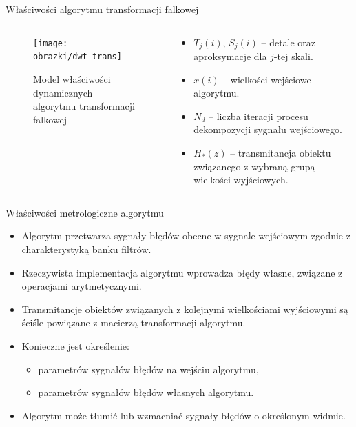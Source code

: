 \documentclass[12pt, polish, aspectratio = 169]{slides}
\begin{document}
\begin{frame}{Właściwości algorytmu transformacji falkowej}
\begin{columns}
\begin{column}{0.5\textwidth}
	\begin{figure}
	\texttt{[image: obrazki/dwt\_trans]}
	\caption{Model właściwości dynamicznych algorytmu transformacji falkowej}
	\end{figure}
\end{column}
\begin{column}{0.5\textwidth}
	\begin{itemize}
	\item $T_{j}(i)$, $S_{j}(i)$ -- detale oraz aproksymacje dla $j$-tej skali.
	\item $x(i)$ -- wielkości wejściowe algorytmu.
	\item $N_{d}$ -- liczba iteracji procesu dekompozycji sygnału wejściowego.
	\item $H_{*}(z)$ -- transmitancja obiektu związanego z wybraną grupą wielkości wyjściowych.
	\end{itemize}
\end{column}
\end{columns}
\end{frame}

\begin{frame}{Właściwości metrologiczne algorytmu}
\begin{itemize}
\item Algorytm przetwarza sygnały błędów obecne w sygnale wejściowym zgodnie z charakterystyką banku filtrów.
\item Rzeczywista implementacja algorytmu wprowadza błędy własne, związane z operacjami arytmetycznymi.
\item Transmitancje obiektów związanych z kolejnymi wielkościami wyjściowymi są ściśle powiązane z macierzą transformacji algorytmu.
\item Konieczne jest określenie:
	\begin{itemize}
	\item parametrów sygnałów błędów na wejściu algorytmu,
	\item parametrów sygnałów błędów własnych algorytmu.
	\end{itemize}
\item Algorytm może tłumić lub wzmacniać sygnały błędów o określonym widmie.
\end{itemize}
\end{frame}
\end{document}
